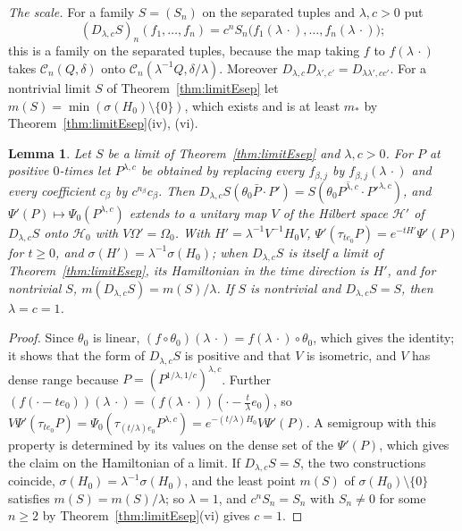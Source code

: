\documentclass[aps,prd,twocolumn,superscriptaddress,nofootinbib,longbibliography,floatfix,amsmath,amssymb,10pt]{revtex4-2}
\newtheorem{lemma}[theorem]{Lemma}
\theoremstyle{definition}
\theoremstyle{remark}
\begin{document}
\emph{The scale.} For a family $S=(S_n)$ on the separated tuples and
$\lambda,c>0$ put
\[
(D_{\lambda,c}S)_n(f_1,\dots,f_n)=c^nS_n\bigl(f_1(\lambda\,\cdot),\dots,
f_n(\lambda\,\cdot)\bigr) ;
\]
this is a family on the separated tuples, because the map taking $f$ to
$f(\lambda\,\cdot)$ takes $\mathcal C_n(Q,\delta)$ onto $\mathcal
C_n(\lambda^{-1}Q,\delta/\lambda)$. Moreover
$D_{\lambda,c}D_{\lambda',c'}=D_{\lambda\lambda',cc'}$. For a nontrivial limit $S$ of
Theorem~\ref{thm:limitEsep} let $m(S)=\min(\sigma(H_0)\setminus\{0\})$,
which exists and is at least $m_*$ by Theorem~\ref{thm:limitEsep}(iv),
(vi).

\begin{lemma}\label{lem:limitEdil}
Let $S$ be a limit of Theorem~\textup{\ref{thm:limitEsep}} and
$\lambda,c>0$. For $P$ at positive $0$-times let $P^{\lambda,c}$ be
obtained by replacing every $f_{\beta,j}$ by $f_{\beta,j}(\lambda\,\cdot)$
and every coefficient $c_\beta$ by $c^{n_\beta}c_\beta$. Then
$D_{\lambda,c}S(\theta_0\bar P\cdot P')=S(\theta_0\overline{P^{\lambda,c}}
\cdot P'^{\lambda,c})$, and $\Psi'(P)\mapsto\Psi_0(P^{\lambda,c})$ extends to
a unitary map $V$ of the Hilbert space $\mathcal H'$ of $D_{\lambda,c}S$
onto $\mathcal H_0$ with $V\Omega'=\Omega_0$. With
$H'=\lambda^{-1}V^{-1}H_0V$, $\Psi'(\tau_{te_0}P)=e^{-tH'}\Psi'(P)$ for
$t\ge0$, and $\sigma(H')=\lambda^{-1}\sigma(H_0)$; when $D_{\lambda,c}S$ is
itself a limit of Theorem~\textup{\ref{thm:limitEsep}}, its Hamiltonian in
the time direction is $H'$, and for nontrivial $S$, $m(D_{\lambda,c}S)=
m(S)/\lambda$. If $S$ is nontrivial and
$D_{\lambda,c}S=S$, then $\lambda=c=1$.
\end{lemma}

\begin{proof}
Since $\theta_0$ is linear, $(f\circ\theta_0)(\lambda\,\cdot)=f(\lambda\,
\cdot)\circ\theta_0$, which gives the identity; it shows that the form of
$D_{\lambda,c}S$ is positive and that $V$ is isometric, and $V$ has dense
range because $P=(P^{1/\lambda,1/c})^{\lambda,c}$. Further
$(f(\cdot-te_0))(\lambda\,\cdot)=(f(\lambda\,\cdot))(\cdot-\frac t\lambda
e_0)$, so $V\Psi'(\tau_{te_0}P)=\Psi_0(\tau_{(t/\lambda)e_0}P^{\lambda,c})=
e^{-(t/\lambda)H_0}V\Psi'(P)$. A semigroup with this property is
determined by its values on the dense set of the $\Psi'(P)$, which gives
the claim on the Hamiltonian of a limit. If $D_{\lambda,c}S=S$, the two
constructions coincide, $\sigma(H_0)=\lambda^{-1}\sigma(H_0)$, and the
least point $m(S)$ of $\sigma(H_0)\setminus\{0\}$ satisfies $m(S)=m(S)/
\lambda$; so $\lambda=1$, and $c^nS_n=S_n$ with $S_n\ne0$ for some $n\ge2$
by Theorem~\ref{thm:limitEsep}(vi) gives $c=1$.
\end{proof}
\end{document}
